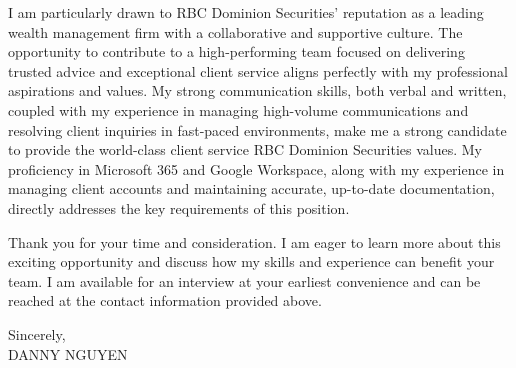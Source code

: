 \documentclass[letterpaper,11pt]{article}
\begin{document}
I am particularly drawn to RBC Dominion Securities' reputation as a leading wealth management firm with a collaborative and supportive culture.  The opportunity to contribute to a high-performing team focused on delivering trusted advice and exceptional client service aligns perfectly with my professional aspirations and values. My strong communication skills, both verbal and written, coupled with my experience in managing high-volume communications and resolving client inquiries in fast-paced environments, make me a strong candidate to provide the world-class client service RBC Dominion Securities values.  My proficiency in Microsoft 365 and Google Workspace, along with my experience in managing client accounts and maintaining accurate, up-to-date documentation, directly addresses the key requirements of this position.

\vspace{10pt}

Thank you for your time and consideration. I am eager to learn more about this exciting opportunity and discuss how my skills and experience can benefit your team. I am available for an interview at your earliest convenience and can be reached at the contact information provided above.


\vspace{20pt}

Sincerely, \\
\vspace{40pt}
DANNY NGUYEN
\end{document}
